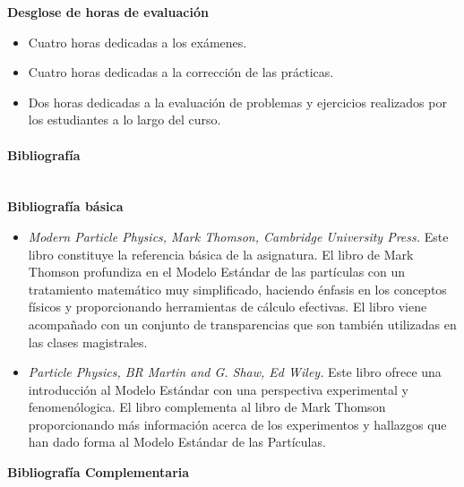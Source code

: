 \textbf{Desglose de horas de evaluación}

\begin{itemize}
    \item Cuatro horas dedicadas a los exámenes.
    \item Cuatro horas dedicadas a la corrección de las prácticas.
    \item Dos horas dedicadas a la evaluación de problemas y ejercicios realizados por los estudiantes a lo largo del curso.
\end{itemize}

\paragraph{Bibliografía\\\\}

\textbf{Bibliografía básica}

\begin{itemize}
    \item \emph{Modern Particle Physics, Mark Thomson, Cambridge University Press.} Este libro constituye la referencia básica de la asignatura. El libro de Mark Thomson profundiza en el Modelo Estándar de las partículas con un tratamiento matemático muy simplificado, haciendo énfasis en los conceptos físicos y proporcionando herramientas de cálculo efectivas. El libro viene acompañado con un conjunto de transparencias que son también utilizadas en las clases magistrales.
    \item \emph{Particle Physics, BR Martin and G. Shaw, Ed Wiley.} Este libro ofrece una introducción al Modelo Estándar con una perspectiva experimental y fenomenólogica. El libro complementa al libro de Mark Thomson proporcionando más información acerca de los experimentos y hallazgos que han dado forma al Modelo Estándar de las Partículas.
\end{itemize}


\textbf{Bibliografía Complementaria}

